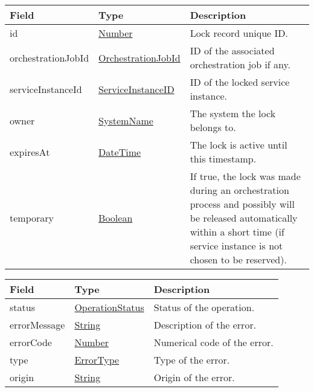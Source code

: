 \documentclass[a4paper]{arrowhead}
\newcommand{\pref}[1]{{\textcolor{ArrowheadGrey}{\hyperref[sec:model:primitives:#1]{#1}}}}
\begin{document}
\begin{table}[ht!]
\begin{tabularx}{\textwidth}{| p{3cm} | p{6.8cm} | X |} \hline
\rowcolor{gray!33} Field & Type & Description \\ \hline
id & \pref{Number} & Lock record unique ID. \\ \hline
orchestrationJobId & \pref{OrchestrationJobId} & ID of the associated orchestration job if any. \\ \hline
serviceInstanceId & \pref{ServiceInstanceID} & ID of the locked service instance. \\ \hline
owner & \pref{SystemName} & The system the lock belongs to. \\ \hline
expiresAt & \pref{DateTime} & The lock is active until this timestamp. \\ \hline
temporary & \pref{Boolean} & If true, the lock was made during an orchestration process and possibly will be released automatically within a short time (if service instance is not chosen to be reserved). \\ \hline
\end{tabularx}
\end{table}


\begin{table}[ht!]
\begin{tabularx}{\textwidth}{| p{4.25cm} | p{3.5cm} | X |} \hline
\rowcolor{gray!33} Field & Type      & Description \\ \hline
status & \pref{OperationStatus} & Status of the operation. \\ \hline
errorMessage & \pref{String} & Description of the error. \\ \hline
errorCode &\pref{Number}  & Numerical code of the error. \\ \hline
type & \pref{ErrorType} & Type of the error. \\ \hline
origin & \pref{String} & Origin of the error. \\ \hline
\end{tabularx}
\end{table}

\clearpage

\end{document}
